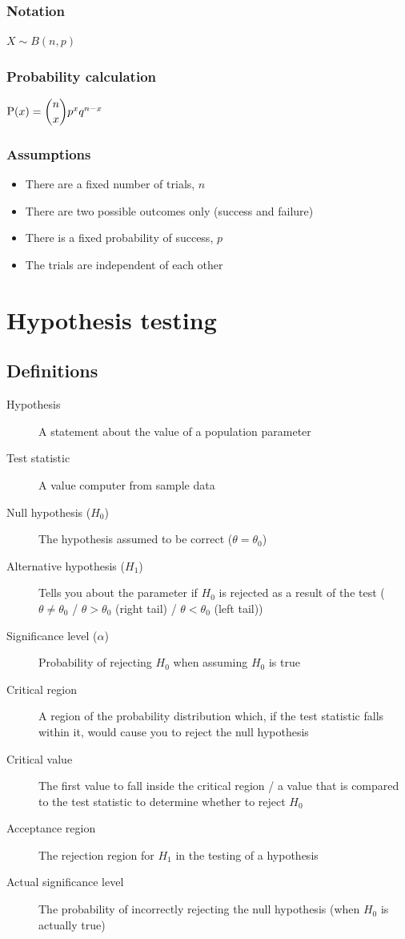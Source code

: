 \documentclass[oneside,fleqn,11pt]{book}
\begin{document}
	\subsection{Notation}
	$X \sim B(n,p)$
	\subsection{Probability calculation}
	$\text{P}(x) = \dbinom{n}{x} p^x q^{n-x}$
	\subsection{Assumptions}
	\begin{itemize}
		\item There are a fixed number of trials, $n$
		\item There are two possible outcomes only (success and failure)
		\item There is a fixed probability of success, $p$
		\item The trials are independent of each other
	\end{itemize}
	
	
	
	
	\pagebreak
	
	
	\chapter{Hypothesis testing}
	\section{Definitions}
	\begin{description}
		\item[Hypothesis] A statement about the value of a population parameter
		\item[Test statistic] A value computer from sample data
		\item[Null hypothesis ($H_0$)] The hypothesis assumed to be correct ($\theta=\theta_0$)
		\item[Alternative hypothesis ($H_1$)] Tells you about the parameter if $H_0$ is rejected as a result of the test ($\theta \neq \theta_0$ / $\theta>\theta_0$ (right tail) / $\theta<\theta_0$ (left tail))
		\item[Significance level ($\alpha$)] Probability of rejecting $H_0$ when assuming $H_0$ is true
		\item[Critical region] A region of the probability distribution which, if the test statistic falls within it, would cause you to reject the null hypothesis
		\item[Critical value] The first value to fall inside the critical region / a value that is compared to the test statistic to determine whether to reject $H_0$
		\item[Acceptance region] The rejection region for $H_1$ in the testing of a hypothesis
		\item[Actual significance level] The probability of incorrectly rejecting the null hypothesis (when $H_0$ is actually true)
	\end{description}
	
\end{document}
